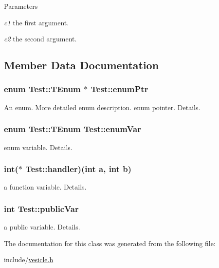 \begin{DoxyParams}{Parameters}
\item[{\em c1}]the first argument. \item[{\em c2}]the second argument. \end{DoxyParams}


\subsection{Member Data Documentation}
\hypertarget{classTest_add1f72d205230e7bac3fcc70a65c1de2}{
\subsubsection[{enumPtr}]{\setlength{\rightskip}{0pt plus 5cm}enum {\bf Test::TEnum} 
       $\ast$ {\bf Test::enumPtr}}}
\label{classTest_add1f72d205230e7bac3fcc70a65c1de2}


An enum. More detailed enum description. enum pointer. Details. \hypertarget{classTest_a0bd371828a36ad7ea83dfd07b2a672b5}{
\subsubsection[{enumVar}]{\setlength{\rightskip}{0pt plus 5cm}enum {\bf Test::TEnum}
        {\bf Test::enumVar}}}
\label{classTest_a0bd371828a36ad7ea83dfd07b2a672b5}


enum variable. Details. \hypertarget{classTest_a8bef142724c4059c18f752e630a4d925}{
\subsubsection[{handler}]{\setlength{\rightskip}{0pt plus 5cm}int($\ast$ {\bf Test::handler})(int a, int b)}}
\label{classTest_a8bef142724c4059c18f752e630a4d925}


a function variable. Details. \hypertarget{classTest_a3085f973ef857d85d647bf04e89760d0}{
\subsubsection[{publicVar}]{\setlength{\rightskip}{0pt plus 5cm}int {\bf Test::publicVar}}}
\label{classTest_a3085f973ef857d85d647bf04e89760d0}


a public variable. Details. 

The documentation for this class was generated from the following file:\begin{DoxyCompactItemize}
\item 
include/\hyperlink{vesicle_8h}{vesicle.h}\end{DoxyCompactItemize}
